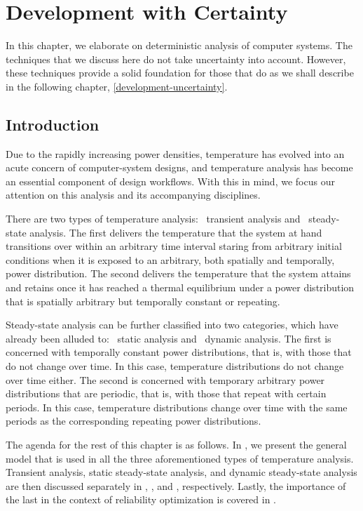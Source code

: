 \chapter{Development with Certainty}

In this chapter, we elaborate on deterministic analysis of computer systems. The
techniques that we discuss here do not take uncertainty into account. However,
these techniques provide a solid foundation for those that do as we shall
describe in the following chapter, \cref{development-uncertainty}.

\section{Introduction}

Due to the rapidly increasing power densities, temperature has evolved into an
acute concern of computer-system designs, and temperature analysis has become an
essential component of design workflows. With this in mind, we focus our
attention on this analysis and its accompanying disciplines.

There are two types of temperature analysis: \one~transient analysis and
\two~steady-state analysis. The first delivers the temperature that the system
at hand transitions over within an arbitrary time interval staring from
arbitrary initial conditions when it is exposed to an arbitrary, both spatially
and temporally, power distribution. The second delivers the temperature that the
system attains and retains once it has reached a thermal equilibrium under a
power distribution that is spatially arbitrary but temporally constant or
repeating.

Steady-state analysis can be further classified into two categories, which have
already been alluded to: \one~static analysis and \two~dynamic analysis. The
first is concerned with temporally constant power distributions, that is, with
those that do not change over time. In this case, temperature distributions do
not change over time either. The second is concerned with temporary arbitrary
power distributions that are periodic, that is, with those that repeat with
certain periods. In this case, temperature distributions change over time with
the same periods as the corresponding repeating power distributions.

The agenda for the rest of this chapter is as follows. In
, we present the general model that is used in all
the three aforementioned types of temperature analysis. Transient analysis,
static steady-state analysis, and dynamic steady-state analysis are then
discussed separately in ,
, and ,
respectively. Lastly, the importance of the last in the context of reliability
optimization is covered in .

